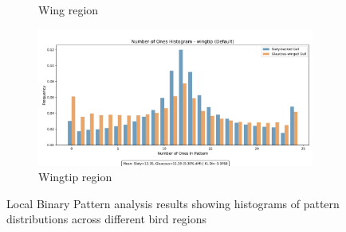 \documentclass[a4paper,12pt]{report}
\begin{document}
\begin{figure}[H]
\begin{subfigure}[b]{0.32\textwidth}
        \caption{Wing region}
        \label{fig:lbp_wing}
    \end{subfigure}
    \hfill
    \begin{subfigure}[b]{0.32\textwidth}
        \centering
        \includegraphics[width=\textwidth]{images/appendix/Number_of_Ones_Analysis/default_wingtip_ones_histogram.png}
        \caption{Wingtip region}
        \label{fig:lbp_wingtip}
    \end{subfigure}
    \caption{Local Binary Pattern analysis results showing histograms of pattern distributions across different bird regions}
    \label{fig:lbp_results}
\end{figure}
\end{document}
